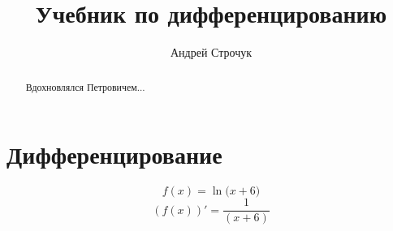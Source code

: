 \documentclass{article}
\title{Учебник по дифференцированию}
\author{Андрей Строчук}
\begin{document}
\maketitle
\begin{abstract}
Вдохновлялся Петровичем...
\end{abstract}
\section{Дифференцирование}
\[f(x) = \ln{({x}+{6}})\]
\[(f(x))' = \frac{{1}}{({x}+{6})}\]
\end{document}
